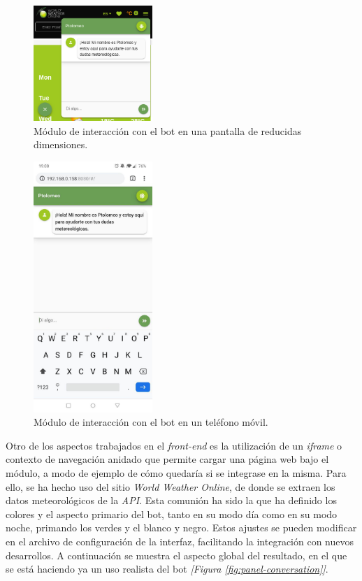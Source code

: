 \documentclass[11pt,spanish,listoffigures]{tfgetsinf}
\begin{document}
\begin{figure}[h!]
    \centering
    \includegraphics[width=0.4\textwidth]{images/img17.png}
    \caption{Módulo de interacción con el bot en una pantalla de reducidas dimensiones.}
    \label{fig:panel-responsive}
\end{figure}

\begin{figure}[h!]
    \centering
    \includegraphics[width=0.4\textwidth]{images/img18.jpg}
    \caption{Módulo de interacción con el bot en un teléfono móvil.}
    \label{fig:panel-phone}
\end{figure}

Otro de los aspectos trabajados en el \textit{front-end} es la utilización de un \textit{iframe} o contexto de navegación anidado que permite cargar una página web bajo el módulo, a modo de ejemplo de cómo quedaría si se integrase en la misma. Para ello, se ha hecho uso del sitio \textit{World Weather Online}, de donde se extraen los datos meteorológicos de la \textit{API}. Esta comunión ha sido la que ha definido los colores y el aspecto primario del bot, tanto en su modo día como en su modo noche, primando los verdes y el blanco y negro. Estos ajustes se pueden modificar en el archivo de configuración de la interfaz, facilitando la integración con nuevos desarrollos. A continuación se muestra el aspecto global del resultado, en el que se está haciendo ya un uso realista del bot \textit{[Figura \ref{fig:panel-conversation}]}.
\end{document}
